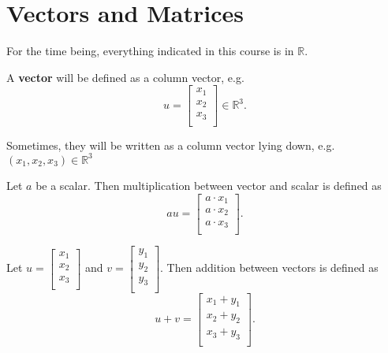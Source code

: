 
\section{Vectors and Matrices}

For the time being, everything indicated in this course is in \( \mathbb{R} \).

\begin{definition}
	A \textbf{vector} will be defined as a column vector, e.g. \[
		u=\begin{bmatrix}
			x_{1} \\
			x_{2} \\
			x_{3} \\
		\end{bmatrix}
		\in \mathbb{R}^3
	.\] 
\end{definition}

\begin{notation}
	Sometimes, they will be written as a column vector lying down, e.g. \( (x_{1},x_{2},x_{3}) \in \mathbb{R}^3 \)
\end{notation}

\begin{definition}
	Let \( a \) be a scalar. Then multiplication between vector and scalar is defined as \[
		au = \begin{bmatrix}
			a\cdot x_{1}\\
			a\cdot x_{2}\\
			a\cdot x_{3}\\
		\end{bmatrix}
	.\] 
\end{definition}

\begin{definition}
	Let \(u = \begin{bmatrix}
			x_{1}\\
			x_{2}\\
			x_{3}\\
		\end{bmatrix} \) and \( v = \begin{bmatrix}
			y_{1}\\
			y_{2}\\
			y_{3}\\
		\end{bmatrix}
	\). Then addition between vectors is defined as \[
		u+v = \begin{bmatrix}
			x_{1}+y_{1}\\
			x_{2}+y_{2}\\
			x_{3}+y_{3}\\
		\end{bmatrix}
	.\] 
\end{definition}

